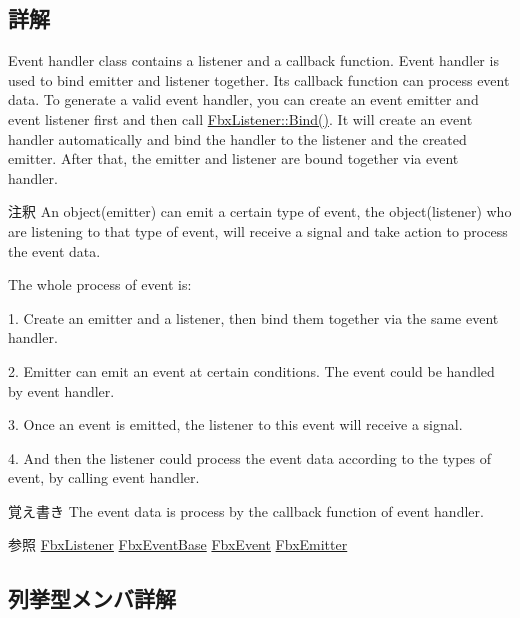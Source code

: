 \subsection{詳解}
Event handler class contains a listener and a callback function. Event handler is used to bind emitter and listener together. Its callback function can process event data. To generate a valid event handler, you can create an event emitter and event listener first and then call \hyperlink{class_fbx_listener_a7a3298b1f4fa347aaa2cb5136265a178}{Fbx\+Listener\+::\+Bind()}. It will create an event handler automatically and bind the handler to the listener and the created emitter. After that, the emitter and listener are bound together via event handler. \begin{DoxyRemark}{注釈}
An object(emitter) can emit a certain type of event, the object(listener) who are listening to that type of event, will receive a signal and take action to process the event data. 
\end{DoxyRemark}
\begin{DoxyParagraph}{The whole process of event is\+:}
\begin{DoxyItemize}
\item 1. Create an emitter and a listener, then bind them together via the same event handler. \item 2. Emitter can emit an event at certain conditions. The event could be handled by event handler. \item 3. Once an event is emitted, the listener to this event will receive a signal. \item 4. And then the listener could process the event data according to the types of event, by calling event handler. \end{DoxyItemize}

\end{DoxyParagraph}
\begin{DoxyNote}{覚え書き}
The event data is process by the callback function of event handler.
\end{DoxyNote}
\begin{DoxySeeAlso}{参照}
\hyperlink{class_fbx_listener}{Fbx\+Listener} \hyperlink{class_fbx_event_base}{Fbx\+Event\+Base} \hyperlink{class_fbx_event}{Fbx\+Event} \hyperlink{class_fbx_emitter}{Fbx\+Emitter} 
\end{DoxySeeAlso}


\subsection{列挙型メンバ詳解}
\mbox{\label{class_fbx_event_handler_a47139da2cfd5abee91664d75c4fb577c}} 
